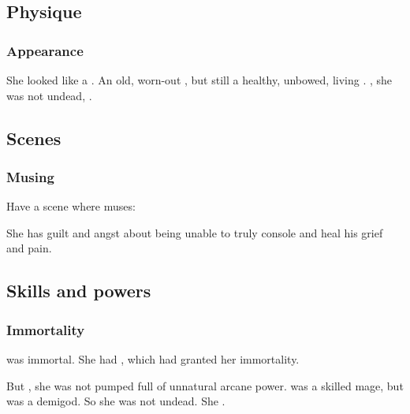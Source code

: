 \subsection{Physique}





\subsubsection{Appearance}
She looked like a \scatha. 
An old, worn-out \scatha, but still a healthy, unbowed, living \scatha.
, she was not undead, .










\subsection{Scenes}
\subsubsection{Musing}
Have a scene where \Criseis{} muses: 

She has guilt and angst about being unable to truly console \Ishnaruchaefir{} and heal his grief and pain. 










\subsection{Skills and powers}





\subsubsection{Immortality}
\Criseis was immortal. 
She had , which had granted her immortality.

But , she was not pumped full of unnatural arcane power. 
\Criseis was a skilled mage, but \Psyrex was a demigod.
So she was not undead. 
She .





